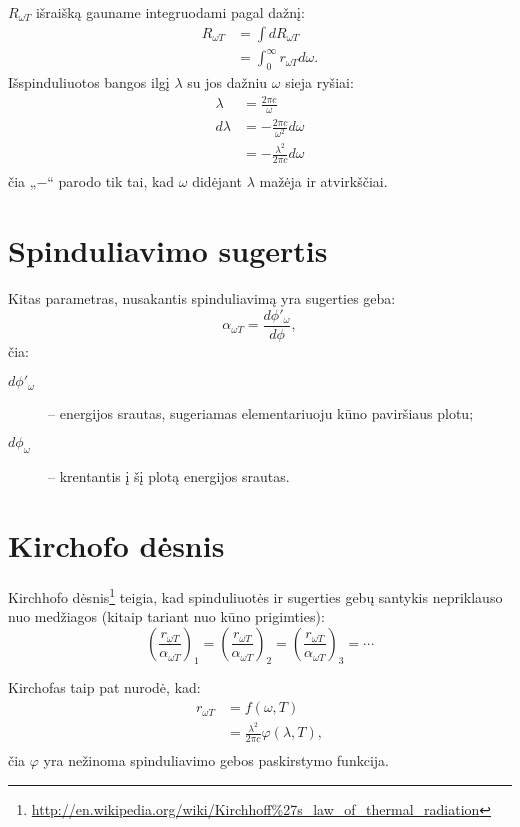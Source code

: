 $R_{\omega T}$ išraišką gauname integruodami pagal dažnį:
\begin{align*}
  R_{\omega T}
  &= \int d R_{\omega T} \\
  &= \int _{0} ^{\infty} r_{\omega T} d \omega.
\end{align*}
Išspinduliuotos bangos ilgį $\lambda$ su jos dažniu $\omega$ sieja
ryšiai:
\begin{align*}
  \lambda &= \frac{2 \pi c}{\omega} \\
  d \lambda
  &= - \frac{2 \pi c}{\omega^{2}}d \omega \\
  &= - \frac{\lambda^{2}}{2 \pi c} d \omega \\
\end{align*}
čia „$-$“ parodo tik tai, kad $\omega$ didėjant $\lambda$ mažėja ir
atvirkščiai.

\section{Spinduliavimo sugertis}

Kitas parametras, nusakantis spinduliavimą yra sugerties geba:
\begin{equation*}
  \alpha_{\omega T} = \frac{d \phi'_{\omega}}{d\phi},
\end{equation*}
čia:
\begin{description}
  \item[$d \phi'_{\omega}$] – energijos srautas, sugeriamas elementariuoju
    kūno paviršiaus plotu;
  \item[$d \phi_{\omega}$] – krentantis į šį plotą energijos srautas.
\end{description}

\section{Kirchofo dėsnis}

Kirchhofo dėsnis\footnote{
\url{http://en.wikipedia.org/wiki/Kirchhoff\%27s_law_of_thermal_radiation}}
teigia, kad spinduliuotės ir sugerties gebų santykis nepriklauso nuo
medžiagos (kitaip tariant nuo kūno prigimties):
\begin{equation*}
  \left( \frac{r_{\omega T}}{\alpha_{\omega T}} \right)_{1} =
  \left( \frac{r_{\omega T}}{\alpha_{\omega T}} \right)_{2} =
  \left( \frac{r_{\omega T}}{\alpha_{\omega T}} \right)_{3} = \cdots
\end{equation*}

Kirchofas taip pat nurodė, kad:
\begin{align*}
  r _{\omega T}
  &= f(\omega, T) \\
  &= \frac{\lambda^{2}}{2 \pi c} \varphi(\lambda, T), \\
\end{align*}
čia $\varphi$ yra nežinoma spinduliavimo gebos paskirstymo funkcija.

